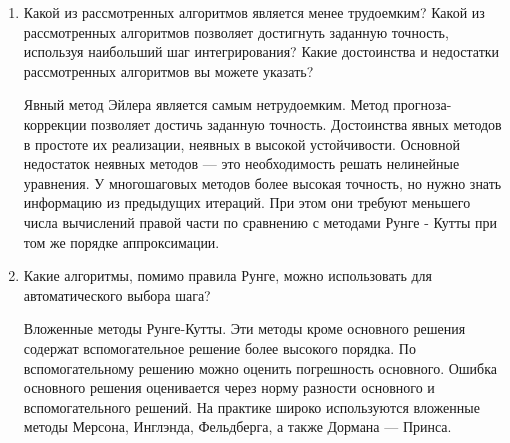 \documentclass[12pt, a4paper]{article}
\begin{document}
\begin{enumerate}
\item Какой из рассмотренных алгоритмов является менее трудоемким? Какой из рассмотренных алгоритмов позволяет достигнуть заданную точность, используя наибольший шаг интегрирования? Какие достоинства и недостатки рассмотренных алгоритмов вы можете указать?

Явный метод Эйлера является самым нетрудоемким. Метод прогноза-коррекции позволяет достичь заданную точность. Достоинства явных методов в простоте их реализации, неявных в высокой устойчивости. Основной недостаток неявных методов --- это необходимость решать нелинейные уравнения. У многошаговых методов более высокая точность, но нужно знать информацию из предыдущих итераций. При этом они требуют меньшего числа вычислений правой части по сравнению с методами Рунге - Кутты при том же порядке аппроксимации.

\item Какие алгоритмы, помимо правила Рунге, можно использовать для автоматического выбора шага?

Вложенные методы Рунге-Кутты. Эти методы кроме основного решения содержат вспомогательное решение более высокого порядка. По вспомогательному решению можно оценить погрешность основного. Ошибка основного решения оценивается через норму разности основного и вспомогательного решений. На практике широко используются вложенные методы Мерсона, Инглэнда, Фельдберга, а также Дормана --- Принса.
\end{enumerate}
\newpage
\end{document}
